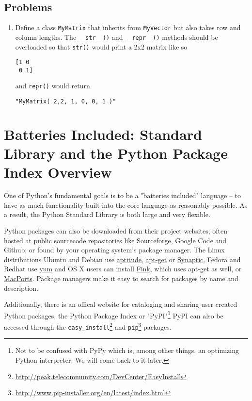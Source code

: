 \subsection{Problems}

\begin{enumerate}

	\item Define a class \verb|MyMatrix| that inherits from \verb|MyVector| but also takes row and column lengths. The \verb|__str__()| and \verb|__repr__()| methods should be overloaded so that \verb|str()| would print a 2x2 matrix like so

\begin{verbatim}
[1 0
 0 1]
\end{verbatim}

and \verb|repr()| would return

\verb|"MyMatrix( 2,2, 1, 0, 0, 1 )"|

\end{enumerate}

\section{ Batteries Included: Standard Library and the Python Package Index Overview}

One of Python's fundamental goals is to be a "batteries included" language -- to have as much functionality built into the core language as reasonably possible. As a result, the Python Standard Library is both large and very flexible. 

Python packages can also be downloaded from their project websites; often hosted at public sourcecode repositories like Sourceforge, Google Code and Github; or found by your operating system's \gls{package manager}. The Linux distributions Ubuntu and Debian use \href{http://wiki.debian.org/Aptitude?action=show&redirect=aptitude}{aptitude}, \href{http://wiki.debian.org/Apt}{apt-get} or \href{https://help.ubuntu.com/community/SynapticHowto}{Synaptic}, Fedora and Redhat use \href{http://yum.baseurl.org/}{yum} and OS X users can install \href{http://www.finkproject.org/}{Fink}, which uses apt-get as well, or \href{http://www.macports.org/index.php}{MacPorts}. Package managers make it easy to search for packages by name and description.

Additionally, there is an offical website for cataloging and sharing user created Python packages, the Python Package Index or "PyPI"\footnote{Not to be confused with PyPy which is, among other things, an optimizing Python interpreter. We will come back to it later.} PyPI can also be accessed through the \verb|easy_install|\footnote{\url{http://peak.telecommunity.com/DevCenter/EasyInstall}} and \verb|pip|\footnote{\url{http://www.pip-installer.org/en/latest/index.html}} packages.

